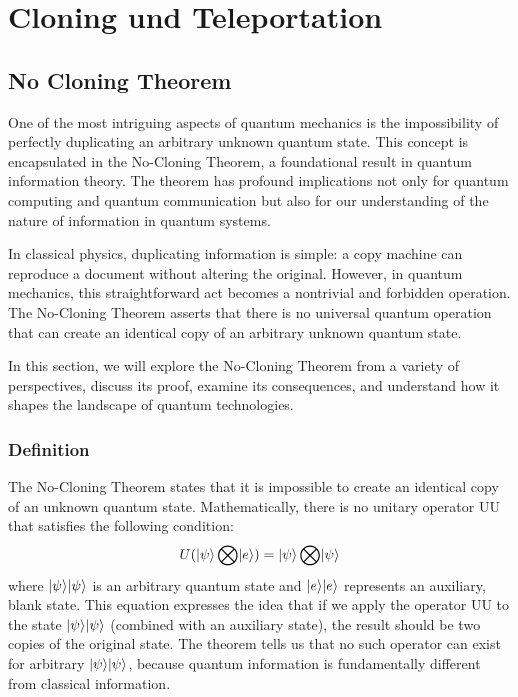 \section{Cloning und Teleportation} \label{sec:cloning-und-teleportation}
\subsection{No Cloning Theorem} \label{subsec:no-cloning}
One of the most intriguing aspects of quantum mechanics is the impossibility of
perfectly duplicating an arbitrary unknown quantum state.
This concept is encapsulated in the No-Cloning Theorem, a foundational result in quantum information theory.
The theorem has profound implications not only for quantum computing and quantum communication
but also for our understanding of the nature of information in quantum systems.

In classical physics, duplicating information is simple:
a copy machine can reproduce a document without altering the original.
However, in quantum mechanics, this straightforward act becomes a nontrivial and forbidden operation.
The No-Cloning Theorem asserts that there is no universal quantum operation
that can create an identical copy of an arbitrary unknown quantum state.

In this section, we will explore the No-Cloning Theorem from a variety of perspectives, discuss its proof,
examine its consequences, and understand how it shapes the landscape of quantum technologies.
\subsubsection{Definition}
The No-Cloning Theorem states that it is impossible to create an identical copy of an unknown quantum state.
Mathematically, there is no unitary operator UU that satisfies the following condition:
\begin{equation}
    U(\lvert\psi\rangle\bigotimes\lvert e\rangle)=\lvert\psi\rangle\bigotimes\lvert\psi\rangle\label {eq:cloning_assertion}
\end{equation}
where $\lvert\psi\rangle\lvert\psi\rangle$ is an arbitrary quantum state and
$\lvert e\rangle\lvert e\rangle$ represents an auxiliary, blank state.
This equation expresses the idea that if we apply the operator UU to the state $\lvert\psi\rangle\lvert\psi\rangle$
(combined with an auxiliary state), the result should be two copies of the original state.
The theorem tells us that no such operator can exist for arbitrary $\lvert\psi\rangle\lvert\psi\rangle$,
because quantum information is fundamentally different from classical information.
